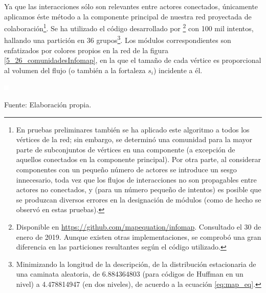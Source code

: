\documentclass[letterpaper, 11pt]{book}
\theoremstyle{definition}
\theoremstyle{remark}
\begin{document}
Ya que las interacciones sólo son relevantes entre actores conectados, únicamente aplicamos éste método a la componente principal de nuestra red proyectada de colaboración\footnote{
    En pruebas preliminares también se ha aplicado este algoritmo a todos los vértices de la red; sin embargo, se determinó una comunidad para la mayor parte de subconjuntos de vértices en una componente (a excepción de aquellos conectados en la componente principal). 
    Por otra parte, al considerar componentes con un pequeño número de actores se introduce un sesgo innecesario, toda vez que los flujos de interacciones no son propagables entre actores no conectados, y (para un número pequeño de intentos) es posible que se produzcan diversos errores en la designación de módulos (como de hecho se observó en estas pruebas). 
}. 
Se ha utilizado el código desarrollado por \citet{2014_Rosvall_CommunityMapEq}\footnote{
    Disponible en \url{https://github.com/mapequation/infomap}. Consultado el 30 de enero de 2019.
    Aunque existen otras implementaciones, se comprobó una gran diferencia en las particiones resultantes según el código utilizado. 
} 
con 100 mil intentos, hallando una partición en 36 grupos\footnote{
    Minimizando la longitud de la descripción, de la distribución estacionaria de una caminata aleatoria, de 6.884364803 (para códigos de Huffman en un nivel) a 4.478814947 (en dos niveles), de acuerdo a la ecuación \ref{eq:map_eq}. 
}. 
Los módulos correspondientes son enfatizados por colores propios en la red de la figura \ref{5_26_comunidadesInfomap}, en la que el tamaño de cada vértice es proporcional al volumen del flujo (o también a la fortaleza $s_{i}$) incidente a él. 



\begin{minipage}{\linewidth}
\centering
{} \label{5_26_comunidadesInfomap}

\includegraphics[scale=0.1]{img/null.png}
\vspace{35em}
\par\bigskip
\small Fuente: Elaboración propia.
\end{minipage}\bigskip
\end{document}

